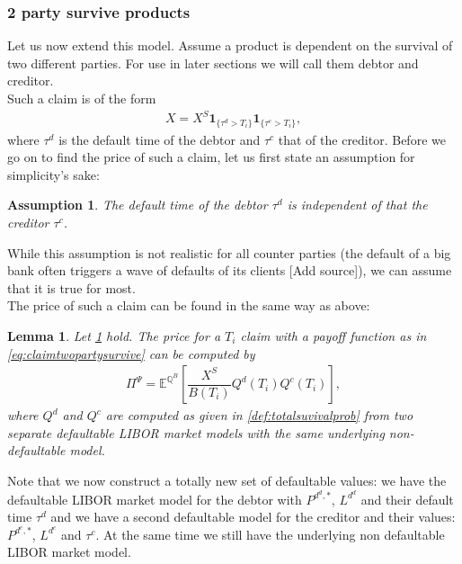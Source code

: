\documentclass[12pt]{article}
\newtheorem{assumption}{Assumption}[section]
\newtheorem{lemma}[theorem]{Lemma}
\begin{document}
	\subsubsection{2 party survive products}
	Let us now extend this model. Assume a product is dependent on the survival of two different parties. For use in later sections we will call them debtor and  creditor.\\
	Such a claim is of the form
	\begin{align}\label{eq:claimtwopartysurvive}
		X = X^S\mathbf{1}_{\{\tau^d > T_i\}}\mathbf{1}_{\{\tau^c > T_i\}},
	\end{align}
	where $\tau^d$ is the default time of the debtor and $\tau^c$ that of the creditor.
	Before we go on to find the price of such a claim, let us first state an assumption for simplicity's sake:
	\begin{assumption}\label{as:counterpartiesareindependent}
		The default time of the debtor $\tau^d$ is independent of that the creditor $\tau^c$.
	\end{assumption}
	While this assumption is not realistic for all counter parties (the default of a big bank often triggers a wave of defaults of its clients \color{red}[Add source]\color{black}), %
	we can assume that it is true for most.\\
	The price of such a claim can be found in the same way as above:
	\begin{lemma}\label{lem:creditordefPrice}
		Let \cref{as:counterpartiesareindependent} hold. The price for a $T_i$ claim with a payoff function as in \cref{eq:claimtwopartysurvive} can be computed by
		\begin{align*}
			\Pi^\Psi = \mathbb{E}^{\mathbb{Q}^B}\left[\dfrac{X^S}{B(T_i)}Q^d(T_i)Q^c(T_i)\right],
		\end{align*}
		where $Q^d$ and $Q^c$ are computed as given in \cref{def:totalsuvivalprob} from two separate defaultable LIBOR market models with the same underlying non-defaultable model.
	\end{lemma}
	Note that we now construct a totally new set of defaultable values: we have the defaultable LIBOR market model for the debtor with $P^{d^d,*}$, $L^{d^d}$ and their default time $\tau^d$ and we have a second defaultable model for the creditor and their values: $P^{d^c,*}$, $L^{d^c}$ and $\tau^c$. At the same time we still have the underlying non defaultable LIBOR market model.
\end{document}
